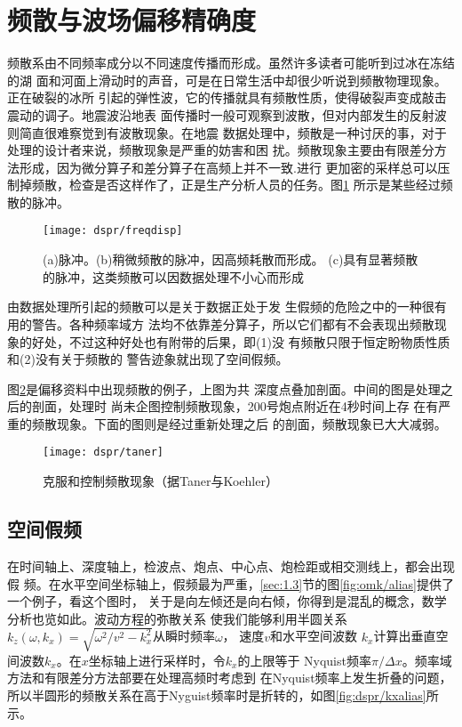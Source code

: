 \section{频散与波场偏移精确度}
\label{sec:4.3}

频散系由不同频率成分以不同速度传播而形成。虽然许多读者可能听到过冰在冻结的湖
面和河面上滑动时的声音，可是在日常生活中却很少听说到频散物理现象。正在破裂的冰所
引起的弹性波，它的传播就具有频散性质，使得破裂声变成敲击震动的调子。地震波沿地表
面传播时一般可观察到波散，但对内部发生的反射波则简直很难察觉到有波散现象。在地震
数据处理中，频散是一种讨厌的事，对于处理的设计者来说，频散现象是严重的妨害和困
扰。频散现象主要由有限差分方法形成，因为微分算子和差分算子在高频上并不一致.进行
更加密的采样总可以压制掉频散，检查是否这样作了，正是生产分析人员的任务。图\ref{fig:dspr/freqdisp}
所示是某些经过频散的脉冲。

\begin{figure}[H]
\centering
\texttt{[image: dspr/freqdisp]}
\caption[freqdisp]{(a)脉冲。(b)稍微频散的脉冲，因高频耗散而形成。
(c)具有显著频散的脉冲，这类频散可以因数据处理不小心而形成}
\label{fig:dspr/freqdisp}
\end{figure}

由数据处理所引起的频散可以是关于数据正处于发
生假频的危险之中的一种很有用的警告。各种频率域方
法均不依靠差分算子，所以它们都有不会表现出频散现
象的好处，不过这种好处也有附带的后果，即(1)没
有频散只限于恒定盼物质性质和(2)没有关于频散的
警告迹象就出现了空间假频。

图\ref{fig:dspr/taner}是偏移资料中出现频散的例子，上图为共
深度点叠加剖面。中间的图是处理之后的剖面，处理时
尚未企图控制频散现象，200号炮点附近在4秒时间上存
在有严重的频散现象。下面的图则是经过重新处理之后
的剖面，频散现象已大大减弱。

\begin{figure}[H]
\centering
\texttt{[image: dspr/taner]}
\caption[taner]{克服和控制频散现象（据Taner与Koehler）}
\label{fig:dspr/taner}
\end{figure}

\subsection{空间假频}
\label{sec:4.3.1}

在时间轴上、深度轴上，检波点、炮点、中心点、炮检距或相交测线上，都会出现假
频。在水平空间坐标轴上，假频最为严重，\ref{sec:1.3}节的图\ref{fig:omk/alias}提供了一个例子，看这个图时，
关于是向左倾还是向右倾，你得到是混乱的概念，数学分析也览如此。波动方程的弥散关系
使我们能够利用半圆关系$k_z(\omega,k_x)=\sqrt{\omega^2/v^2-k_x^2}$从瞬时频率$\omega$，
速度$v$和水平空间波数
$k_x$计算出垂直空间波数$k_x$。在$x$坐标轴上进行采样时，令$k_x$的上限等于
Nyquist频率$\pi/\Delta x$。频率域方法和有限差分方法部要在处理高频时考虑到
在Nyquist频率上发生折叠的问题，
所以半圆形的频散关系在高于Nyguist频率时是折转的，如图\ref{fig:dspr/kxalias}所示。

